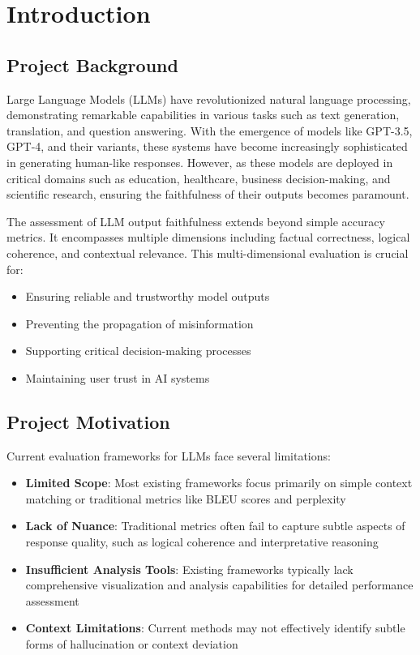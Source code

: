 \section{Introduction}

\subsection{Project Background}
Large Language Models (LLMs) have revolutionized natural language processing, demonstrating remarkable capabilities in various tasks such as text generation, translation, and question answering. With the emergence of models like GPT-3.5, GPT-4, and their variants, these systems have become increasingly sophisticated in generating human-like responses. However, as these models are deployed in critical domains such as education, healthcare, business decision-making, and scientific research, ensuring the faithfulness of their outputs becomes paramount.

The assessment of LLM output faithfulness extends beyond simple accuracy metrics. It encompasses multiple dimensions including factual correctness, logical coherence, and contextual relevance. This multi-dimensional evaluation is crucial for:
\begin{itemize}
    \item Ensuring reliable and trustworthy model outputs
    \item Preventing the propagation of misinformation
    \item Supporting critical decision-making processes
    \item Maintaining user trust in AI systems
\end{itemize}

\subsection{Project Motivation}
Current evaluation frameworks for LLMs face several limitations:

\begin{itemize}
    \item \textbf{Limited Scope}: Most existing frameworks focus primarily on simple context matching or traditional metrics like BLEU scores and perplexity
    \item \textbf{Lack of Nuance}: Traditional metrics often fail to capture subtle aspects of response quality, such as logical coherence and interpretative reasoning
    \item \textbf{Insufficient Analysis Tools}: Existing frameworks typically lack comprehensive visualization and analysis capabilities for detailed performance assessment
    \item \textbf{Context Limitations}: Current methods may not effectively identify subtle forms of hallucination or context deviation
\end{itemize}

